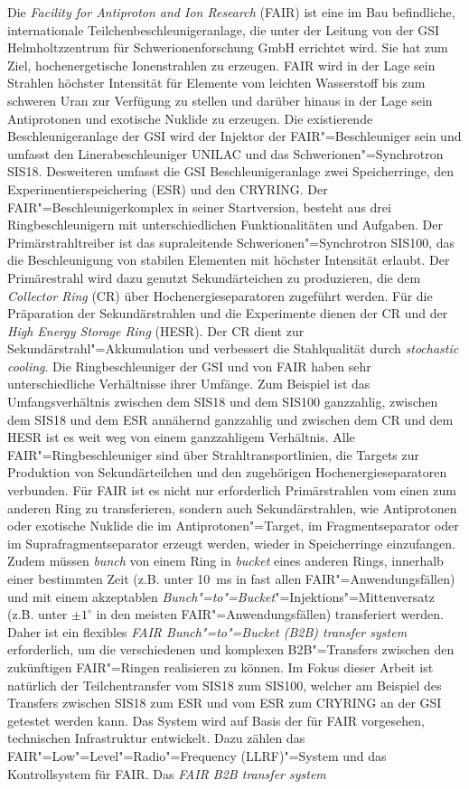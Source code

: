 Die \textit{Facility for Antiproton and Ion Research} (FAIR) ist eine im Bau befindliche, internationale Teilchenbeschleunigeranlage, die unter der Leitung von der GSI Helmholtzzentrum f\"ur Schwerionenforschung GmbH errichtet wird. Sie hat zum Ziel, hochenergetische
Ionenstrahlen zu erzeugen. FAIR wird in der Lage sein Strahlen h\"ochster Intensit\"at für Elemente vom leichten Wasserstoff bis zum schweren Uran zur Verf\"ugung zu stellen und darüber hinaus in der Lage sein Antiprotonen und exotische Nuklide zu erzeugen. Die existierende Beschleunigeranlage der GSI wird der Injektor der FAIR"=Beschleuniger sein und umfasst den Linerabeschleuniger UNILAC und das Schwerionen"=Synchrotron SIS18. Desweiteren umfasst die GSI Beschleunigeranlage zwei Speicherringe, den Experimentierspeichering (ESR) und den CRYRING. Der FAIR"=Beschleunigerkomplex in seiner Startversion, besteht aus drei Ringbeschleunigern mit unterschiedlichen Funktionalit\"aten und Aufgaben. Der Prim\"arstrahltreiber ist das supraleitende Schwerionen"=Synchrotron SIS100, das die Beschleunigung von stabilen Elementen mit h\"ochster Intensit\"at erlaubt. Der Prim\"arestrahl wird dazu genutzt Sekund\"arteichen zu produzieren, die dem \textit{Collector Ring} (CR) \"uber Hochenergieseparatoren zugef\"uhrt werden. F\"ur die Pr\"aparation der Sekund\"arstrahlen und die Experimente dienen der CR und der \textit{High Energy Storage Ring} (HESR). Der CR dient zur Sekund\"arstrahl"=Akkumulation und verbessert die Stahlqualit\"at durch \textit{stochastic cooling}. Die Ringbeschleuniger der GSI und von FAIR haben sehr unterschiedliche Verh\"altnisse ihrer Umf\"ange. Zum Beispiel ist das Umfangsverh\"altnis zwischen dem SIS18 und dem SIS100 ganzzahlig, zwischen dem SIS18 und dem ESR ann\"ahernd ganzzahlig und zwischen dem CR und dem HESR ist es weit weg von einem ganzzahligem Verh\"altnis. Alle FAIR"=Ringbeschleuniger sind \"uber Strahltransportlinien, die Targets zur Produktion von Sekund\"arteilchen und den zugeh\"origen Hochenergieseparatoren verbunden. F\"ur FAIR ist es nicht nur erforderlich Prim\"arstrahlen vom einen zum anderen Ring zu transferieren, sondern auch Sekund\"arstrahlen, wie Antiprotonen oder exotische Nuklide die im Antiprotonen"=Target, im Fragmentseparator oder im Suprafragmentseparator erzeugt werden, wieder in Speicherringe einzufangen. Zudem m\"ussen \textit{bunch} von einem Ring in \textit{bucket} eines anderen Rings, innerhalb einer bestimmten Zeit (z.B. unter \SI{10}{\ms} in fast allen FAIR"=Anwendungsf\"allen) und mit einem akzeptablen \textit{Bunch"=to"=Bucket}"=Injektions"=Mittenversatz (z.B. unter $\pm1^\circ$ in den meisten FAIR"=Anwendungsf\"allen) transferiert werden. Daher ist ein flexibles \textit{FAIR Bunch"=to"=Bucket (B2B) transfer system} erforderlich, um die verschiedenen und komplexen B2B"=Transfers zwischen den zuk\"unftigen FAIR"=Ringen realisieren zu k\"onnen. Im Fokus dieser Arbeit ist nat\"urlich der Teilchentransfer vom SIS18 zum SIS100, welcher am Beispiel des Transfers zwischen SIS18 zum ESR und vom ESR zum CRYRING an der GSI getestet werden kann. Das System wird auf Basis der f\"ur FAIR vorgesehen, technischen Infrastruktur entwickelt. Dazu z\"ahlen das FAIR"=Low"=Level"=Radio"=Frequency (LLRF)"=System und das Kontrollsystem f\"ur FAIR. Das \textit{FAIR B2B transfer system} 